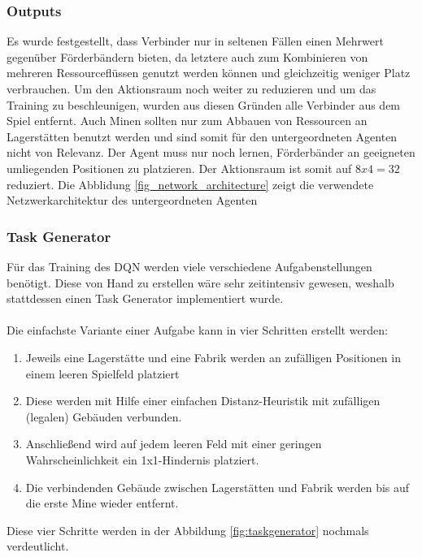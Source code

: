 \subsubsection{Outputs}
Es wurde festgestellt, dass Verbinder nur in seltenen Fällen einen Mehrwert gegenüber Förderbändern bieten, da letztere auch zum Kombinieren von mehreren Ressourceflüssen genutzt werden können und gleichzeitig weniger Platz verbrauchen. 
Um den Aktionsraum noch weiter zu reduzieren und um das Training zu beschleunigen, wurden aus diesen Gründen alle Verbinder aus dem Spiel entfernt. Auch Minen sollten nur zum Abbauen von Ressourcen an Lagerstätten benutzt werden und sind somit für den untergeordneten Agenten nicht von Relevanz. Der Agent muss nur noch lernen, Förderbänder an geeigneten umliegenden Positionen zu platzieren. Der Aktionsraum ist somit auf $8 x 4 = 32$ reduziert. Die Abblidung \ref{fig_network_architecture} zeigt die verwendete Netzwerkarchitektur des untergeordneten Agenten

\subsubsection{Task Generator}
Für das Training des DQN werden viele verschiedene Aufgabenstellungen benötigt. Diese von Hand zu erstellen wäre sehr zeitintensiv gewesen, weshalb stattdessen einen Task Generator implementiert wurde.
\\\\
Die einfachste Variante einer Aufgabe kann in vier Schritten erstellt werden:
\begin{enumerate}
	\item Jeweils eine Lagerstätte und eine Fabrik werden an zufälligen Positionen in einem leeren Spielfeld platziert
	\item Diese werden mit Hilfe einer einfachen Distanz-Heuristik mit zufälligen (legalen) Gebäuden verbunden. 
	\item Anschließend wird auf jedem leeren Feld mit einer geringen Wahrscheinlichkeit ein 1x1-Hindernis platziert. 
	\item Die verbindenden Gebäude zwischen Lagerstätten und Fabrik werden bis auf die erste Mine wieder entfernt. 
\end{enumerate}

Diese vier Schritte werden in der Abbildung \ref{fig:taskgenerator} nochmals verdeutlicht.

